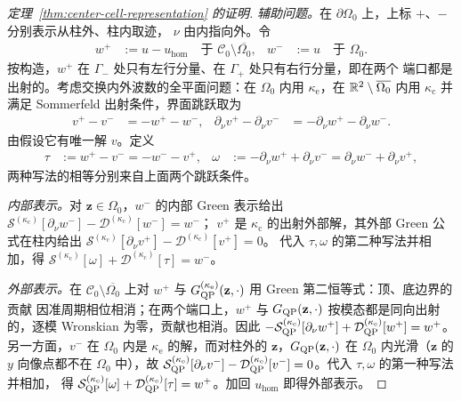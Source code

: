 \begin{proof}[定理~\ref{thm:center-cell-representation} 的证明]
  \emph{辅助问题。}在 $\partial\Omega_0$ 上，上标 $+$、$-$ 分别表示从柱外、柱内取迹，
  $\nu$ 由内指向外。令
  \begin{align*}
    w^+&:=u-u_{\mathrm{hom}}\quad\text{于 }\mathcal C_0\setminus\overline{\Omega_0},
    &w^-&:=u\quad\text{于 }\Omega_0.
  \end{align*}
  按构造，$w^+$ 在 $\Gamma_-$ 处只有左行分量、在 $\Gamma_+$ 处只有右行分量，即在两个
  端口都是出射的。考虑交换内外波数的全平面问题：在 $\Omega_0$ 内用
  $\kappa_{\mathrm e}$，在 $\mathbb{R}^2\setminus\overline{\Omega_0}$ 内用 $\kappa_{\mathrm c}$
  并满足 Sommerfeld 出射条件，界面跳跃取为
  \begin{align*}
    v^+-v^-&=-w^+-w^-,
    &\partial_\nu v^+-\partial_\nu v^-&=-\partial_\nu w^+-\partial_\nu w^-.
  \end{align*}
  由假设它有唯一解 $v$。定义
  \begin{align*}
    \tau&:=w^+-v^-=-w^--v^+,
    &\omega&:=-\partial_\nu w^++\partial_\nu v^-=\partial_\nu w^-+\partial_\nu v^+,
  \end{align*}
  两种写法的相等分别来自上面两个跳跃条件。

  \emph{内部表示。}对 $\mathbf z\in\Omega_0$，$w^-$ 的内部 Green 表示给出
  $\mathcal S^{(\kappa_{\mathrm c})}[\partial_\nu w^-]-\mathcal D^{(\kappa_{\mathrm c})}[w^-]=w^-$；
  $v^+$ 是 $\kappa_{\mathrm c}$ 的出射外部解，其外部 Green 公式在柱内给出
  $\mathcal S^{(\kappa_{\mathrm c})}[\partial_\nu v^+]-\mathcal D^{(\kappa_{\mathrm c})}[v^+]=0$。
  代入 $\tau,\omega$ 的第二种写法并相加，得
  $\mathcal S^{(\kappa_{\mathrm c})}[\omega]+\mathcal D^{(\kappa_{\mathrm c})}[\tau]=w^-$。

  \emph{外部表示。}在 $\mathcal C_0\setminus\overline{\Omega_0}$ 上对 $w^+$ 与
  $G^{(\kappa_{\mathrm e})}_{\mathrm{QP}}(\mathbf z,\cdot)$ 用 Green 第二恒等式：顶、底边界的贡献
  因准周期相位相消；在两个端口上，$w^+$ 与 $G_{\mathrm{QP}}(\mathbf z,\cdot)$ 按模态都是同向出射
  的，逐模 Wronskian 为零，贡献也相消。因此
  $-\mathcal S^{(\kappa_{\mathrm e})}_{\mathrm{QP}}[\partial_\nu w^+]
  +\mathcal D^{(\kappa_{\mathrm e})}_{\mathrm{QP}}[w^+]=w^+$。另一方面，$v^-$ 在 $\Omega_0$ 内是
  $\kappa_{\mathrm e}$ 的解，而对柱外的 $\mathbf z$，$G_{\mathrm{QP}}(\mathbf z,\cdot)$ 在
  $\Omega_0$ 内光滑（$\mathbf z$ 的 $y$ 向像点都不在 $\Omega_0$ 中），故
  $\mathcal S^{(\kappa_{\mathrm e})}_{\mathrm{QP}}[\partial_\nu v^-]
  -\mathcal D^{(\kappa_{\mathrm e})}_{\mathrm{QP}}[v^-]=0$。代入 $\tau,\omega$ 的第一种写法并相加，
  得 $\mathcal S^{(\kappa_{\mathrm e})}_{\mathrm{QP}}[\omega]+\mathcal D^{(\kappa_{\mathrm e})}_{\mathrm{QP}}[\tau]
  =w^+$。加回 $u_{\mathrm{hom}}$ 即得外部表示。


\end{proof}

